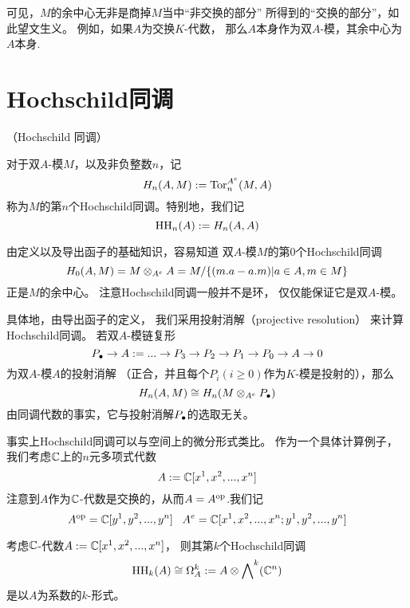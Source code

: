 可见，$M$的余中心无非是商掉$M$当中“非交换的部分”
所得到的“交换的部分”，如此望文生义。
例如，如果$A$为交换$K$-代数，
那么$A$本身作为双$A$-模，其余中心为$A$本身.

\section{Hochschild同调}

\begin{definition}（Hochschild 同调）

对于双$A$-模$M$，以及非负整数$n$，记
$$H_n(A,M):=\operatorname{Tor}_n^{A^e}(M,A)$$
称为$M$的第$n$个Hochschild同调。特别地，我们记
$$\operatorname{HH}_n(A):=H_n(A,A)$$
\end{definition}

由定义以及导出函子的基础知识，容易知道
双$A$-模$M$的第$0$个Hochschild同调
$$H_0(A,M)=M\otimes_{A^e}A=M/\{(m.a-a.m)|a\in A,m\in M\}$$
正是$M$的余中心。
注意Hochschild同调一般并不是环，
仅仅能保证它是双$A$-模。


具体地，由导出函子的定义，
我们采用投射消解（projective resolution）
来计算Hochschild同调。
若双$A$-模链复形
$$P_{\bullet}\to A:=
...\to P_3\to P_2\to P_1\to P_0\to A\to 0$$
为双$A$-模$A$的投射消解
（正合，并且每个$P_i(i\geq 0)$作为$K$-模是投射的），那么
$$H_n(A,M)\cong H_n(M\otimes_{A^e}P_{\bullet})$$
由同调代数的事实，它与投射消解$P_{\bullet}$的选取无关。\vs

事实上Hochschild同调可以与空间上的微分形式类比。
作为一个具体计算例子，我们考虑$\mathbb{C}$上的$n$元多项式代数
$$A:=\mathbb{C}[x^1,x^2,...,x^n]$$
注意到$A$作为$\mathbb{C}$-代数是交换的，从而$A=A^{\text{op}}$.我们记
$$A^{\text{op}}=\mathbb{C}[y^1,y^2,...,y^n]\,\,\,\,\,
A^e=\mathbb{C}[x^1,x^2,...,x^n;y^1,y^2,...,y^n]$$

\begin{prop}
\label{C[x^i]的HH同调}
考虑$\mathbb{C}$-代数$A:=\mathbb{C}[x^1,x^2,...,x^n]$，
则其第$k$个Hochschild同调
$$\operatorname{HH}_k(A)\cong\Omega^k_A:=A\otimes\bigwedge\nolimits^ k(\mathbb{C}^n)$$
是以$A$为系数的$k$-形式。
\end{prop}

